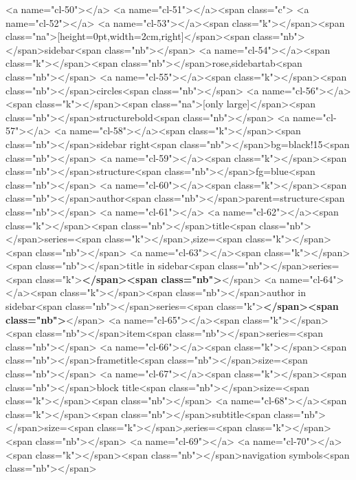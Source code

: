 <a name="cl-50"></a>
<a name="cl-51"></a><span class="c">%
<a name="cl-52"></a>
<a name="cl-53"></a><span class="k">\useoutertheme</span><span class="na">[height=0pt,width=2cm,right]</span><span class="nb">{</span>sidebar<span class="nb">}</span>
<a name="cl-54"></a><span class="k">\usecolortheme</span><span class="nb">{</span>rose,sidebartab<span class="nb">}</span>
<a name="cl-55"></a><span class="k">\useinnertheme</span><span class="nb">{</span>circles<span class="nb">}</span>
<a name="cl-56"></a><span class="k">\usefonttheme</span><span class="na">[only large]</span><span class="nb">{</span>structurebold<span class="nb">}</span>
<a name="cl-57"></a>
<a name="cl-58"></a><span class="k">\setbeamercolor</span><span class="nb">{</span>sidebar right<span class="nb">}{</span>bg=black!15<span class="nb">}</span>
<a name="cl-59"></a><span class="k">\setbeamercolor</span><span class="nb">{</span>structure<span class="nb">}{</span>fg=blue<span class="nb">}</span>
<a name="cl-60"></a><span class="k">\setbeamercolor</span><span class="nb">{</span>author<span class="nb">}{</span>parent=structure<span class="nb">}</span>
<a name="cl-61"></a>
<a name="cl-62"></a><span class="k">\setbeamerfont</span><span class="nb">{</span>title<span class="nb">}{</span>series=<span class="k">\normalfont</span>,size=<span class="k">\LARGE</span><span class="nb">}</span>
<a name="cl-63"></a><span class="k">\setbeamerfont</span><span class="nb">{</span>title in sidebar<span class="nb">}{</span>series=<span class="k">\bfseries</span><span class="nb">}</span>
<a name="cl-64"></a><span class="k">\setbeamerfont</span><span class="nb">{</span>author in sidebar<span class="nb">}{</span>series=<span class="k">\bfseries</span><span class="nb">}</span>
<a name="cl-65"></a><span class="k">\setbeamerfont*</span><span class="nb">{</span>item<span class="nb">}{</span>series=<span class="nb">}</span>
<a name="cl-66"></a><span class="k">\setbeamerfont</span><span class="nb">{</span>frametitle<span class="nb">}{</span>size=<span class="nb">}</span>
<a name="cl-67"></a><span class="k">\setbeamerfont</span><span class="nb">{</span>block title<span class="nb">}{</span>size=<span class="k">\small</span><span class="nb">}</span>
<a name="cl-68"></a><span class="k">\setbeamerfont</span><span class="nb">{</span>subtitle<span class="nb">}{</span>size=<span class="k">\normalsize</span>,series=<span class="k">\normalfont</span><span class="nb">}</span>
<a name="cl-69"></a>
<a name="cl-70"></a><span class="k">\setbeamertemplate</span><span class="nb">{</span>navigation symbols<span class="nb">}{}</span>
